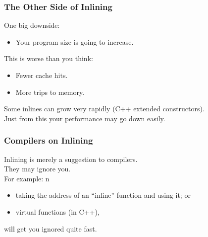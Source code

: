 \begin{frame}
  \frametitle{The Other Side of Inlining}

  

  One big downside:
  \begin{itemize}
    \item Your program size is going to increase.
  \end{itemize}
   This is worse than you think:
      \begin{itemize}
        \item Fewer cache hits.
        \item More trips to memory.
      \end{itemize}
   Some inlines can grow very rapidly (C++ extended constructors).\\[1em]
  Just from this your performance may go down easily.
  
\end{frame}

\begin{frame}
  \frametitle{Compilers on Inlining}

  

  Inlining is merely a suggestion to compilers.\\
  They may ignore you.\\[1em]

  For example:
n  \begin{itemize}
    \item taking the address of an ``inline'' function and using it; or
    \item virtual functions (in C++),
  \end{itemize}
  will get you ignored quite fast.
  
\end{frame}


